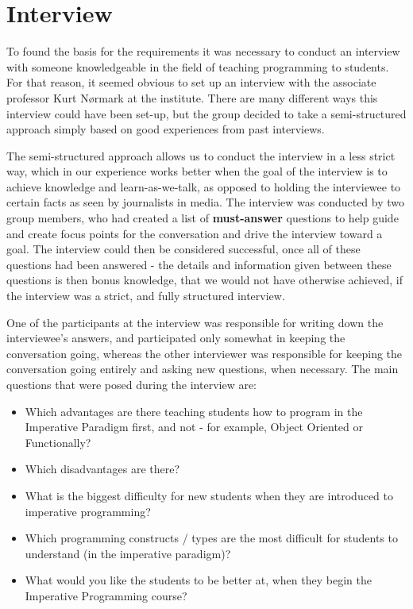 \section{Interview}

To found the basis for the requirements it was necessary to conduct an interview with someone knowledgeable in the field of teaching programming to students. For that reason, it seemed obvious to set up an interview with the associate professor Kurt N{\o}rmark at the institute. There are many different ways this interview could have been set-up, but the group decided to take a semi-structured approach simply based on good experiences from past 
interviews. 


The semi-structured approach allows us to conduct the interview in a less strict way, which in our experience works better when the goal of the interview is to achieve knowledge and learn-as-we-talk, as opposed to holding the interviewee to certain facts as seen by journalists in media. The interview was conducted by two group members, who had created a list of \textbf{must-answer} questions to help guide and create focus points for the conversation and drive the interview toward a goal. The interview could then be considered successful, once all of these questions had been answered - the details and information given between these questions is then bonus knowledge, that we would not have otherwise achieved, if the interview was a strict, and fully structured interview.

One of the participants at the interview was responsible for writing down the interviewee's answers, and participated only somewhat in keeping the conversation going, whereas the other interviewer was responsible for keeping the conversation going entirely and asking new questions, when necessary. The main questions that were posed during the interview are:

\begin{itemize}
	\item {} Which advantages are there teaching students how to program in the Imperative Paradigm first, and not - for example, Object 
	Oriented or Functionally?
	\item Which disadvantages are there?
	\item What is the biggest difficulty for new students when they are introduced to imperative programming?
	\item Which programming constructs / types are the most difficult for students to understand (in the imperative paradigm)?
	\item What would you like the students to be better at, when they begin the Imperative Programming course?
\end{itemize}


